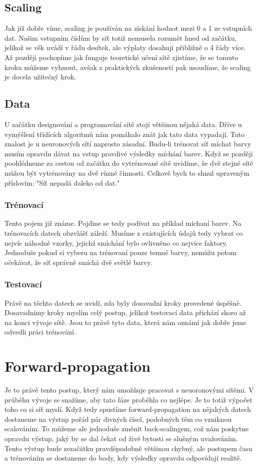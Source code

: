 \documentclass[12pt,a4paper]{report}
\begin{document}
	\section{Scaling}
	Jak již dobře víme, scaling je používán na získání hodnot mezi 0 a 1 ze vstupních dat. Našim vstupním číslům by síť totiž nemusela rozumět hned od začátku, jelikož se věk uvádí v řádu desítek, ale výplaty dosahují přibližně o 4 řády více. Až později pochopíme jak funguje teoretické učení sítě zjistíme, že se tomuto kroku můžeme vyhnout, avšak z praktických zkušeností pak usoudíme, že scaling je docela užitečný krok.
	\section{Data}
	U začátku designování a programování sítě stojí většinou nějaká data. Dříve u vymýšlení třídících algoritmů nám pomáhalo znát jak tato data vypadají. Tato znalost je u neuronových sítí naprosto zásadní. Budu-li trénovat síť míchat barvy musím opravdu dávat na vstup pravdivé výsledky míchání barev. Když se později poohlédneme za cestou od začátku do vytrénované sítě uvidíme, že dvě stejné sítě můžou být vytrénovány na dvě různé činnosti. Celkově bych to shnul upraveným příslovím: "Síť nepadá daleko od dat."
		\subsection{Trénovací}
		Tento pojem již známe. Pojďme se tedy podívat na příklad míchaní barev. Na trénovacích datech obzvlášť záleží. Musíme z existujících údajů tedy vybrat co nejvíc náhodně vzorky, jejichž smíchání bylo ovlivněno co nejvíce faktory. Jednoduše pokud si vyberu na trénovaní pouze temné barvy, nemůžu potom očekávat, že síť správně smíchá dvě světlé barvy.
		\subsection{Testovací}
		Právě na těchto datech se uvidí, zda byly dosavadní kroky provedené úspěšně. Dosavadnímy kroky myslím celý postup, jelikož testovací data přichází skoro až na konci vývoje sítě. Jsou to právě tyto data, která nám oznámí jak dobře jsme odvedli práci trénování.
\chapter{Forward-propagation}
	Je to právě tento postup, který nám umožňuje pracovat s neuoronovými sítěmi. V průběhu vývoje se snažíme, aby tato fáze proběhla co nejlépe. Je to totiž výpočet toho co si síť myslí. Když tedy spustíme forward-propagation na nějakých datech dostaneme na výstup pořád pár divných čísel, podobných těm co vzniknou scalováním. To můžeme ale jednoduše změnit back-scalingem, což nám poskytne opravdu výstup, jaký by se dal čekat od živé bytosti se slušným uvažováním. Tento výstup bude zezačátku pravděpodobně většinou chybný, ale postupem času a trénováním se dostaneme do body, kdy výsledky opravdu odpovídají realitě.
\end{document}
